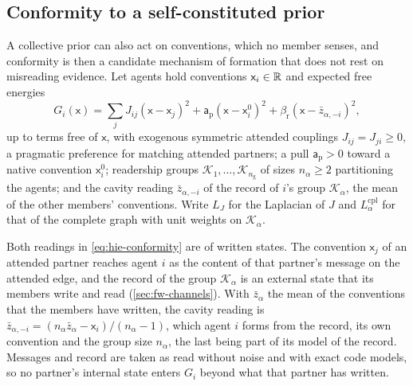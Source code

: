 \subsection{Conformity to a self-constituted prior}\label{sec:hie-conformity}

A collective prior can also act on conventions, which no member senses, and conformity is then a candidate mechanism of formation that does not rest on misreading evidence. Let agents hold conventions $\mathsf x_i\in\mathbb{R}$ and expected free energies
\begin{equation}\label{eq:hie-conformity}
G_i(\mathsf x)=\sum_jJ_{ij}(\mathsf x-\mathsf x_j)^2+\mathsf a_{\mathrm p}(\mathsf x-\mathsf x^0_i)^2+\beta_{\mathrm r}(\mathsf x-\bar z_{\alpha,-i})^2,
\end{equation}
up to terms free of $\mathsf x$, with exogenous symmetric attended couplings $J_{ij}=J_{ji}\ge0$, a pragmatic preference for matching attended partners; a pull $\mathsf a_{\mathrm p}>0$ toward a native convention $\mathsf x^0_i$; readership groups $\mathcal K_1,\dots,\mathcal K_{n_{\mathrm g}}$ of sizes $n_\alpha\ge2$ partitioning the agents; and the cavity reading $\bar z_{\alpha,-i}$ of the record of $i$'s group $\mathcal K_\alpha$, the mean of the other members' conventions. Write $L_J$ for the Laplacian of $J$ and $L^{\mathrm{cpl}}_\alpha$ for that of the complete graph with unit weights on $\mathcal K_\alpha$.

Both readings in \eqref{eq:hie-conformity} are of written states. The convention $\mathsf x_j$ of an attended partner reaches agent $i$ as the content of that partner's message on the attended edge, and the record of the group $\mathcal K_\alpha$ is an external state that its members write and read (\cref{sec:fw-channels}). With $\bar z_\alpha$ the mean of the conventions that the members have written, the cavity reading is $\bar z_{\alpha,-i}=(n_\alpha\bar z_\alpha-\mathsf x_i)/(n_\alpha-1)$, which agent $i$ forms from the record, its own convention and the group size $n_\alpha$, the last being part of its model of the record. Messages and record are taken as read without noise and with exact code models, so no partner's internal state enters $G_i$ beyond what that partner has written.

